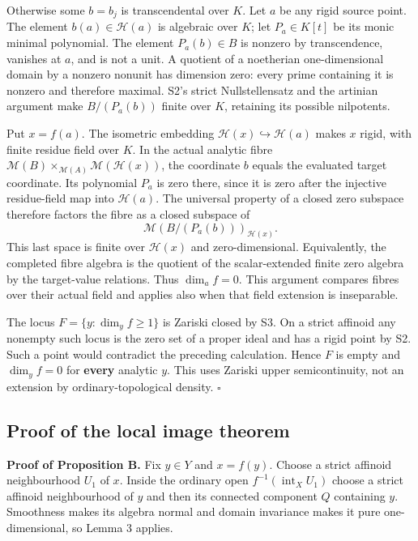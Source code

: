 \documentclass[
  11pt,
]{article}
\begin{document}
Otherwise some \(b=b_j\) is transcendental over \(K\). Let \(a\) be any
rigid source point. The element \(b(a)\in\mathcal H(a)\) is algebraic
over \(K\); let \(P_a\in K[t]\) be its monic minimal polynomial. The
element \(P_a(b)\in B\) is nonzero by transcendence, vanishes at \(a\),
and is not a unit. A quotient of a noetherian one-dimensional domain by
a nonzero nonunit has dimension zero: every prime containing it is
nonzero and therefore maximal. S2's strict Nullstellensatz and the
artinian argument make \(B/(P_a(b))\) finite over \(K\), retaining its
possible nilpotents.

Put \(x=f(a)\). The isometric embedding
\(\mathcal H(x)\hookrightarrow\mathcal H(a)\) makes \(x\) rigid, with
finite residue field over \(K\). In the actual analytic fibre
\(\mathcal M(B)\times_{\mathcal M(A)}\mathcal M(\mathcal H(x))\), the
coordinate \(b\) equals the evaluated target coordinate. Its polynomial
\(P_a\) is zero there, since it is zero after the injective
residue-field map into \(\mathcal H(a)\). The universal property of a
closed zero subspace therefore factors the fibre as a closed subspace of
\[
                 \mathcal M(B/(P_a(b)))_{\mathcal H(x)}.
\] This last space is finite over \(\mathcal H(x)\) and
zero-dimensional. Equivalently, the completed fibre algebra is the
quotient of the scalar-extended finite zero algebra by the target-value
relations. Thus \(\dim_a f=0\). This argument compares fibres over their
actual field and applies also when that field extension is inseparable.

The locus \(F=\{y:\dim_y f\geq1\}\) is Zariski closed by S3. On a strict
affinoid any nonempty such locus is the zero set of a proper ideal and
has a rigid point by S2. Such a point would contradict the preceding
calculation. Hence \(F\) is empty and \(\dim_y f=0\) for \textbf{every}
analytic \(y\). This uses Zariski upper semicontinuity, not an extension
by ordinary-topological density. \(\square\)

\subsection{Proof of the local image
theorem}\label{proof-of-the-local-image-theorem}

\textbf{Proof of Proposition B.} Fix \(y\in Y\) and \(x=f(y)\). Choose a
strict affinoid neighbourhood \(U_1\) of \(x\). Inside the ordinary open
\(f^{-1}(\operatorname{int}_X U_1)\) choose a strict affinoid
neighbourhood of \(y\) and then its connected component \(Q\) containing
\(y\). Smoothness makes its algebra normal and domain invariance makes
it pure one-dimensional, so Lemma 3 applies.
\end{document}
